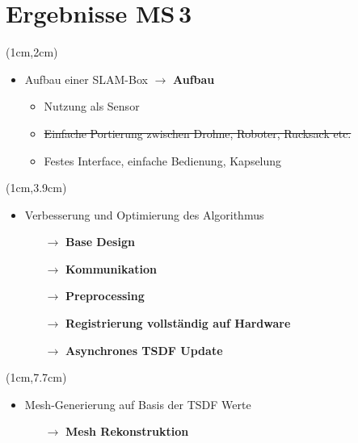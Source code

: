 \documentclass{beamer}
\begin{document}
\section{Ergebnisse MS\,3}
\begin{frame}{\secname}
\begin{textblock*}{12cm}(1cm,2cm)
\begin{itemize}
\item{Aufbau einer SLAM-Box {\small\color{dark}$\rightarrow$ \textbf{Aufbau}}}
\begin{itemize}
\item{Nutzung als Sensor}
\item{\sout{Einfache Portierung zwischen Drohne, Roboter, Rucksack etc.}}
\item{Festes Interface, einfache Bedienung, Kapselung}
\end{itemize}
\end{itemize}
\end{textblock*}
\begin{textblock*}{12cm}(1cm,3.9cm)
\begin{itemize}
\item{Verbesserung und Optimierung des Algorithmus}
\begin{itemize}
\item[$\rightarrow$]{\color{dark} \textbf{Base Design}}
\item[$\rightarrow$]{\color{dark} \textbf{Kommunikation}}
\item[$\rightarrow$]{\color{dark} \textbf{Preprocessing}}
\item[$\rightarrow$]{\color{dark} \textbf{Registrierung vollständig auf Hardware}}
\item[$\rightarrow$]{\color{dark} \textbf{Asynchrones TSDF Update}}
\end{itemize}
\end{itemize}
\end{textblock*}
\begin{textblock*}{12cm}(1cm,7.7cm)
\begin{itemize}
\item{Mesh-Generierung auf Basis der TSDF Werte}
\begin{itemize}
\item[$\rightarrow$]{\color{dark} \textbf{Mesh Rekonstruktion}}
\end{itemize}
\end{itemize}
\end{textblock*}
\end{frame}
\end{document}
